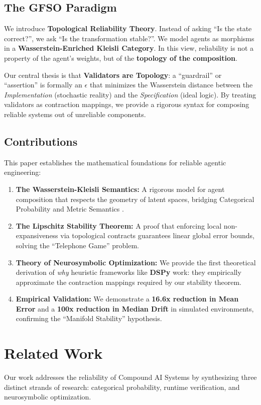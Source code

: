 \documentclass[11pt]{article}
\theoremstyle{definition}
\begin{document}
\subsection{The GFSO Paradigm}
 We introduce \textbf{Topological Reliability Theory}. Instead of asking ``Is the state correct?'', we ask ``Is the transformation stable?''. We model agents as morphisms in a \textbf{Wasserstein-Enriched Kleisli Category}. In this view, reliability is not a property of the agent's weights, but of the \textbf{topology of the composition}.

Our central thesis is that \textbf{Validators are Topology}: a ``guardrail'' or ``assertion'' is formally an $\epsilon$ that minimizes the Wasserstein distance between the \textit{Implementation} (stochastic reality) and the \textit{Specification} (ideal logic). By treating validators as contraction mappings, we provide a rigorous syntax for composing reliable systems out of unreliable components.

\subsection{Contributions}
 This paper establishes the mathematical foundations for reliable agentic engineering:
\begin{enumerate}
    \item \textbf{The Wasserstein-Kleisli Semantics:} A rigorous model for agent composition that respects the geometry of latent spaces, bridging Categorical Probability \cite{fritz2020} and Metric Semantics \cite{kozen1981}.
    \item \textbf{The Lipschitz Stability Theorem:} A proof that enforcing local non-expansiveness via topological contracts guarantees linear global error bounds, solving the ``Telephone Game'' problem.
    \item \textbf{Theory of Neurosymbolic Optimization:} We provide the first theoretical derivation of \textit{why} heuristic frameworks like \textbf{DSPy} \cite{khattab2024} work: they empirically approximate the contraction mappings required by our stability theorem.
    \item \textbf{Empirical Validation:} We demonstrate a \textbf{16.6x reduction in Mean Error} and a \textbf{100x reduction in Median Drift} in simulated environments, confirming the ``Manifold Stability'' hypothesis.
\end{enumerate}

\section{Related Work}
 Our work addresses the reliability of Compound AI Systems by synthesizing three distinct strands of research: categorical probability, runtime verification, and neurosymbolic optimization.
\end{document}
